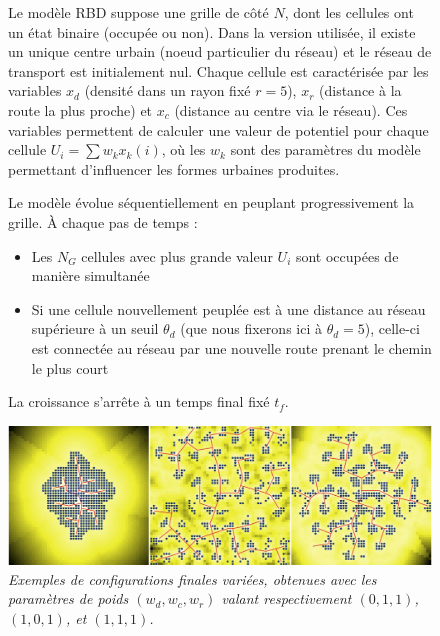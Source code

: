 \begin{figure}[h!]
\begin{mdframed}
Le modèle RBD suppose une grille de côté $N$, dont les cellules ont un état binaire (occupée ou non). Dans la version utilisée, il existe un unique centre urbain (noeud particulier du réseau) et le réseau de transport est initialement nul. Chaque cellule est caractérisée par les variables $x_d$ (densité dans un rayon fixé $r=5$), $x_r$ (distance à la route la plus proche) et $x_c$ (distance au centre via le réseau). Ces variables permettent de calculer une valeur de potentiel pour chaque cellule $U_i = \sum w_k x_k (i)$, où les $w_k$ sont des paramètres du modèle permettant d'influencer les formes urbaines produites.

Le modèle évolue séquentiellement en peuplant progressivement la grille. À chaque pas de temps :
\begin{itemize}
	\item Les $N_G$ cellules avec plus grande valeur $U_i$ sont occupées de manière simultanée
	\item Si une cellule nouvellement peuplée est à une distance au réseau supérieure à un seuil $\theta_d$ (que nous fixerons ici à $\theta_d = 5$), celle-ci est connectée au réseau par une nouvelle route prenant le chemin le plus court
\end{itemize}

La croissance s'arrête à un temps final fixé $t_f$.

\medskip

\includegraphics[width=\linewidth]{Figures/Final/4-2-2-frame-causalityregimes-rdb.jpg}
\textit{Exemples de configurations finales variées, obtenues avec les paramètres de poids $(w_{d},w_{c},w_{r})$ valant respectivement $(0,1,1)$,$(1,0,1)$, et $(1,1,1)$.}

\medskip

\end{mdframed}
\end{figure}






